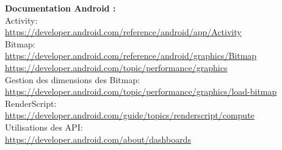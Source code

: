 \documentclass[12pt, a4paper]{article}
\begin{document}
\textbf{Documentation Android :}
\\
Activity:
\\
\url{https://developer.android.com/reference/android/app/Activity}
\\
Bitmap:
\\
\url{https://developer.android.com/reference/android/graphics/Bitmap}
\url{https://developer.android.com/topic/performance/graphics}
\\
Gestion des dimensions des Bitmap:
\\
\url{https://developer.android.com/topic/performance/graphics/load-bitmap}
\\
RenderScript:
\\
\url{https://developer.android.com/guide/topics/renderscript/compute}
\\
Utilisations des API:
\\
\url{https://developer.android.com/about/dashboards}
\\
\end{document}
